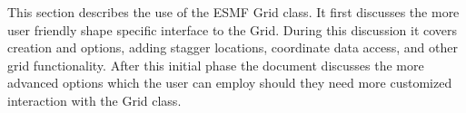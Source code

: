 
This section describes the use of the ESMF Grid class. It first discusses
the more user friendly shape specific interface to the Grid. 
During this discussion it covers creation and options, 
adding stagger locations, coordinate data access, and other grid 
functionality. After this initial phase the document discusses 
the more advanced options which the user can employ should they
need more customized interaction with the Grid class.




 








